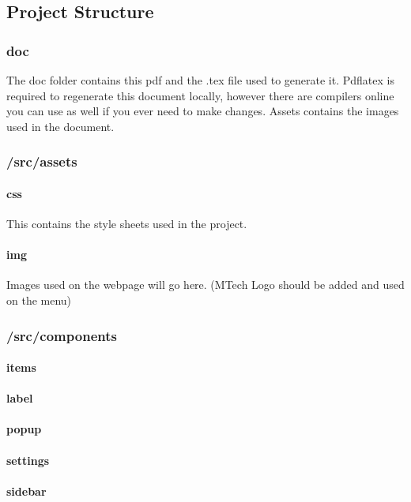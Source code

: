 \documentclass[12pt, titlepage]{article}
\begin{document}
\subsection{Project Structure}
\subsubsection{doc}

The doc folder contains this pdf and the .tex file used to generate it. Pdflatex is required to regenerate this document locally, however there are compilers online you can use as well if you ever need to make changes. Assets contains the images used in the document.

\subsubsection{/src/assets}
    \paragraph{css}
    This contains the style sheets used in the project.
    \paragraph{img}
    Images used on the webpage will go here. (MTech Logo should be added and used on the menu)

\subsubsection{/src/components}
    \paragraph{items}

    \paragraph{label}

    \paragraph{popup}

    \paragraph{settings}

    \paragraph{sidebar}
\end{document}
